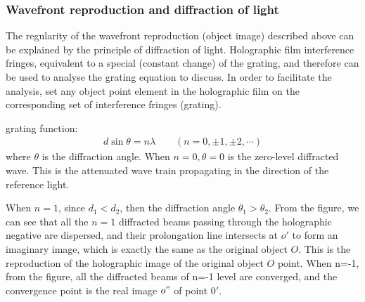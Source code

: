 \documentclass[UTF8]{article}
\begin{document}
   \subsubsection{Wavefront reproduction and diffraction of light}
   The regularity of the wavefront reproduction (object image) described above can be explained by the principle of diffraction of light. Holographic film interference fringes, equivalent to a special (constant change) of the grating, and therefore can be used to analyse the grating equation to discuss. In order to facilitate the analysis, set any object point element in the holographic film on the corresponding set of interference fringes (grating).
   
   grating function:
   \begin{eqnarray}
   d \sin\theta = n\lambda \qquad (n = 0,\pm 1, \pm 2,\cdots)
   \end{eqnarray}
   where $\theta$ is the diffraction angle.
   When $n = 0, \theta = 0$ is the zero-level diffracted wave. This is the attenuated wave train propagating in the direction of the reference light.
   
   When $n=1$, since $d_1<d_2$, then the diffraction angle $\theta_1> \theta_2$. From the figure, we can see that all the $n=1$ diffracted beams passing through the holographic negative are dispersed, and their prolongation line intersects at $o'$ to form an imaginary image, which is exactly the same as the original object $O$. This is the reproduction of the holographic image of the original object $O$ point.
   When n=-1, from the figure, all the diffracted beams of n=-1 level are converged, and the convergence point is the real image $o"$ of point $0'$.
   
\end{document}
